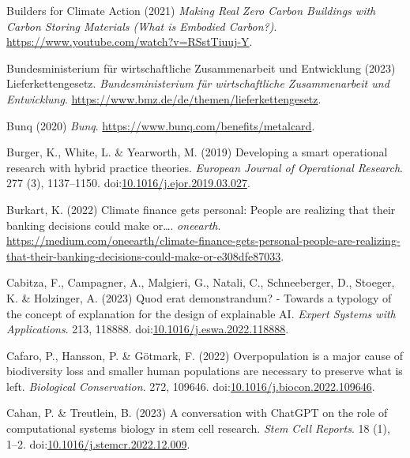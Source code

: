\documentclass[
  letterpaper,
  DIV=11,
  numbers=noendperiod]{scrartcl}
\newlength{\cslhangindent}
\newenvironment{CSLReferences}[2] %
 {\begin{list}{}{%
  \setlength{\itemindent}{0pt}
  \setlength{\leftmargin}{0pt}
  \setlength{\parsep}{0pt}
  \ifodd #1
   \setlength{\leftmargin}{\cslhangindent}
   \setlength{\itemindent}{-1\cslhangindent}
  \fi
  \setlength{\itemsep}{#2\baselineskip}}}
 {\end{list}}
\begin{document}
\begin{CSLReferences}{0}{1}
Builders for Climate Action (2021) \emph{Making {Real Zero Carbon
Buildings} with {Carbon Storing Materials} ({What} is {Embodied
Carbon}?)}. \url{https://www.youtube.com/watch?v=RSstTiuuj-Y}.

Bundesministerium für wirtschaftliche Zusammenarbeit und Entwicklung
(2023) {Lieferkettengesetz}. \emph{Bundesministerium f{ü}r
wirtschaftliche Zusammenarbeit und Entwicklung}.
\url{https://www.bmz.de/de/themen/lieferkettengesetz}.

Bunq (2020) \emph{Bunq}. \url{https://www.bunq.com/benefits/metalcard}.

Burger, K., White, L. \& Yearworth, M. (2019) Developing a smart
operational research with hybrid practice theories. \emph{European
Journal of Operational Research}. 277 (3), 1137--1150.
doi:\href{https://doi.org/10.1016/j.ejor.2019.03.027}{10.1016/j.ejor.2019.03.027}.

Burkart, K. (2022) Climate finance gets personal: People are realizing
that their banking decisions could make or{\ldots{}}. \emph{oneearth}.
\url{https://medium.com/oneearth/climate-finance-gets-personal-people-are-realizing-that-their-banking-decisions-could-make-or-e308dfe87033}.

Cabitza, F., Campagner, A., Malgieri, G., Natali, C., Schneeberger, D.,
Stoeger, K. \& Holzinger, A. (2023) Quod erat demonstrandum? - {Towards}
a typology of the concept of explanation for the design of explainable
{AI}. \emph{Expert Systems with Applications}. 213, 118888.
doi:\href{https://doi.org/10.1016/j.eswa.2022.118888}{10.1016/j.eswa.2022.118888}.

Cafaro, P., Hansson, P. \& Götmark, F. (2022) Overpopulation is a major
cause of biodiversity loss and smaller human populations are necessary
to preserve what is left. \emph{Biological Conservation}. 272, 109646.
doi:\href{https://doi.org/10.1016/j.biocon.2022.109646}{10.1016/j.biocon.2022.109646}.

Cahan, P. \& Treutlein, B. (2023) A conversation with {ChatGPT} on the
role of computational systems biology in stem cell research. \emph{Stem
Cell Reports}. 18 (1), 1--2.
doi:\href{https://doi.org/10.1016/j.stemcr.2022.12.009}{10.1016/j.stemcr.2022.12.009}.


\end{CSLReferences}
\end{document}
